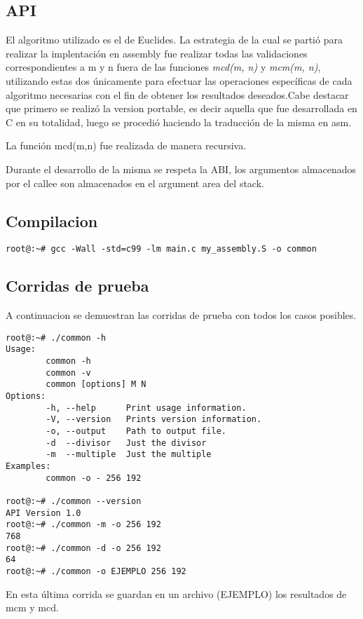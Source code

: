 \documentclass[a4paper,10pt]{article}
\begin{document}
\subsection{API}

El algoritmo utilizado es el de Euclides. La estrategia de la cual se partió para realizar la implentación en assembly fue realizar todas las validaciones correspondientes a m y n fuera de las funciones \textit{mcd(m, n)} y \textit{mcm(m, n)}, utilizando estas dos únicamente para
efectuar las operaciones específicas de cada algoritmo necesarias con el fin de obtener los resultados deseados.Cabe destacar que primero se realizó la version portable, es decir aquella que fue desarrollada en C en su totalidad, luego se procedió haciendo la traducción de la misma en asm.

	La función mcd(m,n) fue realizada de manera recursiva.
	
	Durante el desarrollo de la misma se respeta la ABI, los argumentos almacenados por el callee son almacenados en el argument area del stack.
	
\subsection{Compilacion}


\begin{lstlisting}[style=noframe]
root@:~# gcc -Wall -std=c99 -lm main.c my_assembly.S -o common
\end{lstlisting}
\newpage
\subsection{Corridas de prueba}

A continuacion se demuestran las corridas de prueba con todos los casos posibles.
\begin{lstlisting}[style=MyFrame]
root@:~# ./common -h
Usage:
        common -h 
        common -v 
        common [options] M N 
Options:
        -h, --help      Print usage information.
        -V, --version   Prints version information.
        -o, --output    Path to output file.
        -d  --divisor   Just the divisor
        -m  --multiple  Just the multiple
Examples:
        common -o - 256 192
        
root@:~# ./common --version
API Version 1.0
root@:~# ./common -m -o 256 192
768
root@:~# ./common -d -o 256 192
64
root@:~# ./common -o EJEMPLO 256 192

\end{lstlisting}
En esta última corrida se guardan en un archivo (EJEMPLO) los resultados de mcm y mcd.
\end{document}
